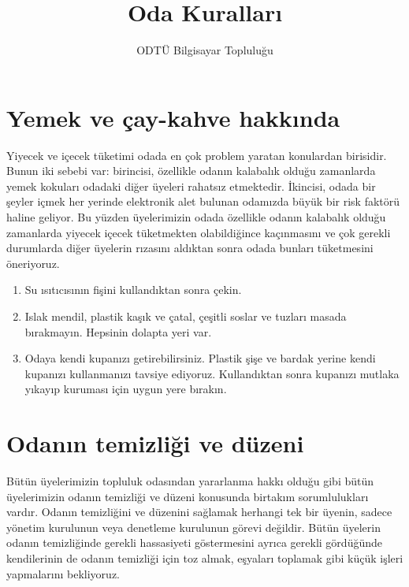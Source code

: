 \documentclass{article}
\title{Oda Kuralları}
\author{ODTÜ Bilgisayar Topluluğu}
\begin{document}
\maketitle

\section{Yemek ve çay-kahve hakkında}

Yiyecek ve içecek tüketimi odada en çok problem yaratan konulardan birisidir. Bunun iki sebebi var: birincisi, özellikle odanın kalabalık olduğu zamanlarda yemek kokuları odadaki diğer üyeleri rahatsız etmektedir. İkincisi, odada bir şeyler içmek her yerinde elektronik alet bulunan odamızda büyük bir risk faktörü haline geliyor. Bu yüzden üyelerimizin odada özellikle odanın kalabalık olduğu zamanlarda yiyecek içecek tüketmekten olabildiğince kaçınmasını ve çok gerekli durumlarda diğer üyelerin rızasını aldıktan sonra odada bunları tüketmesini öneriyoruz.

\begin{enumerate}
	\item Su ısıtıcısının fişini kullandıktan sonra çekin.
	\item Islak mendil, plastik kaşık ve çatal, çeşitli soslar ve tuzları masada bırakmayın. Hepsinin dolapta yeri var. 
	\item Odaya kendi kupanızı getirebilirsiniz. Plastik şişe ve bardak yerine kendi kupanızı kullanmanızı tavsiye ediyoruz. Kullandıktan sonra kupanızı mutlaka yıkayıp kuruması için uygun yere bırakın.
\end{enumerate}

\section{Odanın temizliği ve düzeni}

Bütün üyelerimizin topluluk odasından yararlanma hakkı olduğu gibi bütün üyelerimizin odanın temizliği ve düzeni konusunda birtakım sorumlulukları vardır. Odanın temizliğini ve düzenini sağlamak herhangi tek bir üyenin, sadece yönetim kurulunun veya denetleme kurulunun görevi değildir. Bütün üyelerin odanın temizliğinde gerekli hassasiyeti göstermesini ayrıca gerekli gördüğünde kendilerinin de odanın temizliği için toz almak, eşyaları toplamak gibi küçük işleri yapmalarını bekliyoruz.
\end{document}

